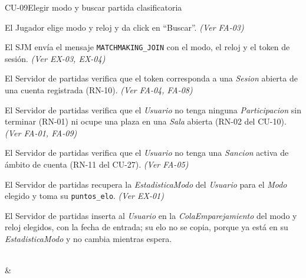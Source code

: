 \begin{fichacu}{CU-09}{Elegir modo y buscar partida clasificatoria}
{\begin{cuenum}[start=1]
      \item El Jugador elige modo y reloj y da click en ``Buscar''. \textit{(Ver \mbox{FA-03})}
      \item El SJM envía el mensaje \texttt{MATCHMAKING\_\allowbreak{}JOIN} con el modo, el reloj y el token de sesión. \textit{(Ver \mbox{EX-03}, \mbox{EX-04})}
      \item El Servidor de partidas verifica que el token corresponda a una \textit{Sesion} abierta de una cuenta registrada (\mbox{RN-10}). \textit{(Ver \mbox{FA-04}, \mbox{FA-08})}
      \item El Servidor de partidas verifica que el \textit{Usuario} no tenga ninguna \textit{Participacion} sin terminar (\mbox{RN-01}) ni ocupe una plaza en una \textit{Sala} abierta (\mbox{RN-02} del \mbox{CU-10}). \textit{(Ver \mbox{FA-01}, \mbox{FA-09})}
      \item El Servidor de partidas verifica que el \textit{Usuario} no tenga una \textit{Sancion} activa de ámbito de cuenta (\mbox{RN-11} del \mbox{CU-27}). \textit{(Ver \mbox{FA-05})}
      \item El Servidor de partidas recupera la \textit{EstadisticaModo} del \textit{Usuario} para el \textit{Modo} elegido y toma su \texttt{puntos\_\allowbreak{}elo}. \textit{(Ver \mbox{EX-01})}
      \item El Servidor de partidas inserta al \textit{Usuario} en la \textit{ColaEmparejamiento} del modo y reloj elegidos, con la fecha de entrada; su elo no se copia, porque ya está en su \textit{EstadisticaModo} y no cambia mientras espera.
    \end{cuenum}} \\
   & 
\end{fichacu}
